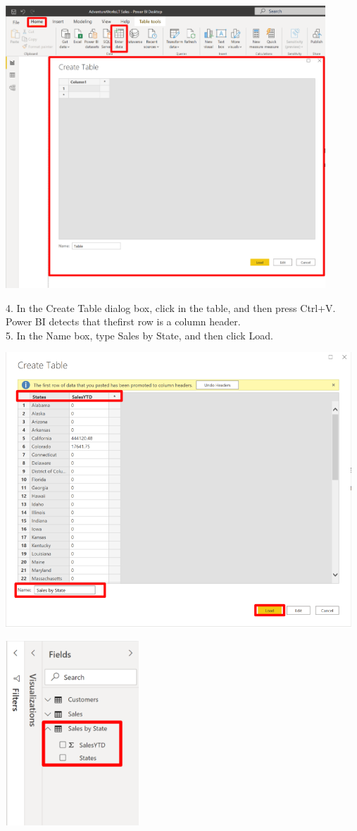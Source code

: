 \documentclass[12pt,letterpaper]{article}
\begin{document}
\begin{center}
    \includegraphics[width=12cm]{img/41.png}  
\end{center}
4. In the Create Table dialog box, click in the table, and then press Ctrl+V. Power BI detects that thefirst row is
a column header.
\\5. In the Name box, type Sales by State, and then click Load.
\begin{center}
    \includegraphics[width=13cm]{img/42.png}  
\end{center}
\begin{center}
    \includegraphics[width=5cm]{img/43.png}  
\end{center}
\end{document}
